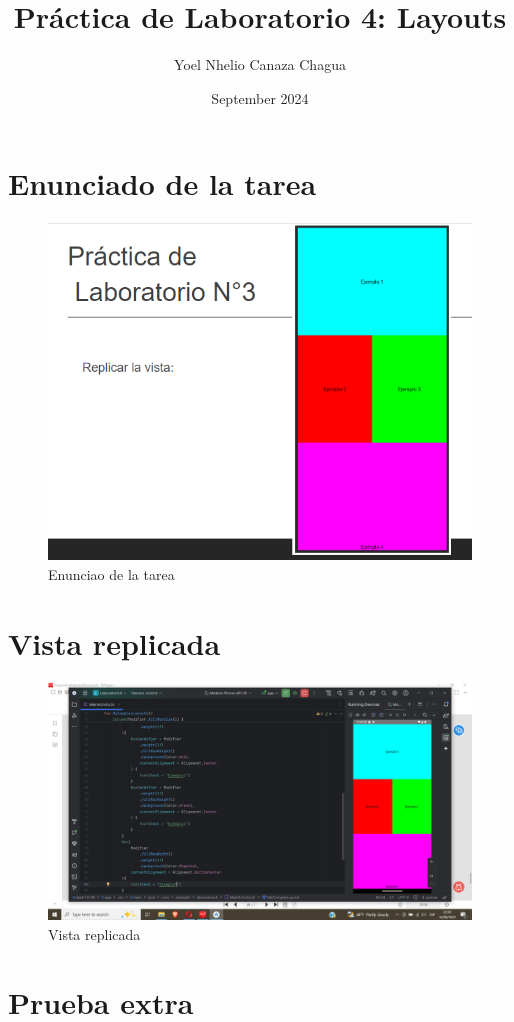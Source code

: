 \documentclass{article}
\title{Práctica de Laboratorio 4: Layouts}
\author{Yoel Nhelio Canaza Chagua}
\date{September 2024}
\begin{document}
\maketitle

\section{Enunciado de la tarea}

\begin{figure}[H]
    \centering
    \includegraphics[width=0.5\linewidth]{1.png}
    \caption{Enunciao de la tarea}
    \label{fig:enter-label}
\end{figure}

\section{Vista replicada}

\begin{figure}[H]
    \centering
    \includegraphics[width=0.8\linewidth]{2.png}
    \caption{Vista replicada}
    \label{fig:enter-label}
\end{figure}


\section{Prueba extra}
\end{document}
